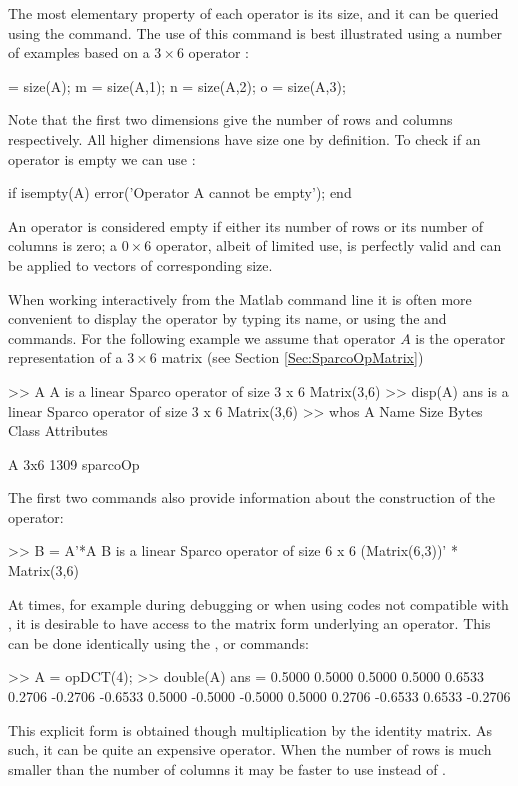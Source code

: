 The most elementary property of each operator is its size, and it can
be queried using the  command. The use of this command is
best illustrated using a number of examples based on a $3\times 6$
operator :
\begin{codeblock}
[m,n] = size(A);    %
m = size(A,1);      %
n = size(A,2);      %
o = size(A,3);      %
\end{codeblock}
Note that the first two dimensions give the number of rows and columns
respectively. All higher dimensions have size one by definition. To
check if an operator is empty we can use :
\begin{codeblock}
if isempty(A)
   error('Operator A cannot be empty');
end
\end{codeblock}
An operator is considered empty if either its number of rows or its
number of columns is zero; a $0\times 6$ operator, albeit of limited
use, is perfectly valid and can be applied to vectors of corresponding
size.

When working interactively from the Matlab command line it is often
more convenient to display the operator by typing its name, or using
the  and  commands. For the following example
we assume that operator $A$ is the operator representation of a
$3\times 6$ matrix (see Section \ref{Sec:SparcoOpMatrix})
\begin{codeblock}
>> A
A is a linear Sparco operator of size 3 x 6
         Matrix(3,6)
>> disp(A)
ans is a linear Sparco operator of size 3 x 6
         Matrix(3,6)
>> whos A
  Name      Size            Bytes  Class       Attributes

  A         3x6              1309  sparcoOp              
\end{codeblock}
The first two commands also provide information about the construction
of the operator:
\begin{codeblock}
>> B = A'*A
B is a linear Sparco operator of size 6 x 6
         (Matrix(6,3))' * Matrix(3,6)
\end{codeblock}

At times, for example during debugging or when using codes not
compatible with \spot{}, it is desirable to have access to the matrix
form underlying an operator. This can be done identically using the
, or  commands:
\begin{codeblock}
>> A = opDCT(4);
>> double(A)
ans =
    0.5000    0.5000    0.5000    0.5000
    0.6533    0.2706   -0.2706   -0.6533
    0.5000   -0.5000   -0.5000    0.5000
    0.2706   -0.6533    0.6533   -0.2706
\end{codeblock}
This explicit form is obtained though multiplication by the identity
matrix. As such, it can be quite an expensive operator. When the
number of rows is much smaller than the number of columns it may be
faster to use  instead of .

